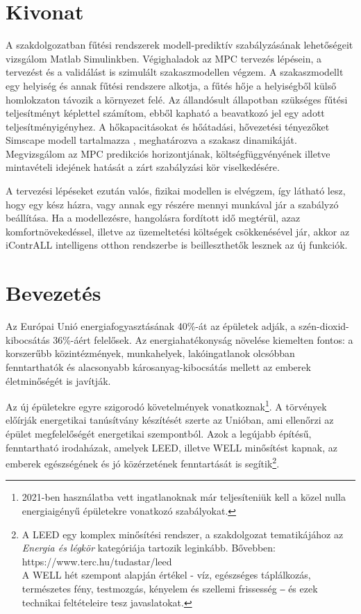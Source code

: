 \chapter*{Kivonat}

A szakdolgozatban fűtési rendszerek modell-prediktív szabályzásának lehetőségeit vizsgálom Matlab Simulinkben.
Végighaladok az MPC tervezés lépésein, a tervezést és a validálást is szimulált szakaszmodellen végzem. A szakaszmodellt egy helyiség és annak fűtési rendszere alkotja, a fűtés hője a helyiségből külső homlokzaton távozik a környezet felé. Az állandósult állapotban szükséges fűtési teljesítményt képlettel számítom, ebből kapható a beavatkozó jel egy adott teljesítményigényhez. A hőkapacitásokat és hőátadási, hővezetési tényezőket Simscape modell tartalmazza%
, meghatározva a szakasz dinamikáját. Megvizsgálom az MPC predikciós horizontjának, költségfüggvényének illetve mintavételi idejének hatását a zárt szabályzási kör viselkedésére. 


A tervezési lépéseket ezután valós, fizikai modellen is elvégzem, így látható lesz, hogy egy kész házra, vagy annak egy részére mennyi munkával jár a szabályzó beállítása. Ha a modellezésre, hangolásra fordított idő megtérül, azaz komfortnövekedéssel, illetve az üzemeltetési költségek csökkenésével jár, akkor az iContrALL intelligens otthon rendszerbe is beilleszthetők lesznek az új funkciók.


\chapter{Bevezetés}
Az Európai Unió energiafogyasztásának 40\%-át az épületek adják, a szén-dioxid-kibocsátás 36\%-áért felelősek. Az energiahatékonyság növelése kiemelten fontos: a korszerűbb közintézmények, munkahelyek, lakóingatlanok olcsóbban fenntarthatók és alacsonyabb károsanyag-kibocsátás mellett az emberek életminőségét is javítják.

Az új épületekre egyre szigorodó követelmények vonatkoznak\footnote{2021-ben használatba vett ingatlanoknak már teljesíteniük kell a közel nulla energiaigényű épületekre \cite{NZEB} vonatkozó szabályokat. }.
A törvények előírják energetikai tanúsítvány készítését szerte az Unióban, ami ellenőrzi az épület megfelelőségét energetikai szempontból.
Azok a legújabb építésű, fenntartható irodaházak, amelyek LEED, illetve WELL minősítést kapnak, az emberek egészségének és jó közérzetének fenntartását is segítik\footnote{A LEED egy komplex minősítési rendszer, a szakdolgozat tematikájához az \textit{Energia és légkör} kategóriája tartozik leginkább. Bővebben: https://www.terc.hu/tudastar/leed \\
A WELL hét szempont alapján értékel - víz, egészséges táplálkozás, természetes fény, testmozgás, kényelem és szellemi frissesség ‒ és ezek technikai feltételeire tesz javaslatokat.}.


